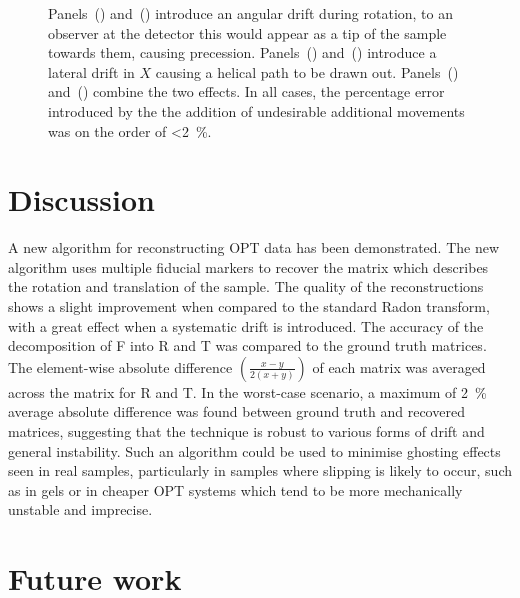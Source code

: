 \documentclass[times, twoside, watermark]{zHenriquesLab-StyleBioRxiv}
\begin{document}
\begin{figure}
{          Panels~() and~() introduce an angular drift during rotation, to an observer at the detector this would appear as a tip of the sample towards them, causing precession.
          Panels~() and~() introduce a lateral drift in \(X\) causing a helical path to be drawn out.
          Panels~() and~() combine the two effects.
          In all cases, the percentage error introduced by the the addition of undesirable additional movements was on the order of \SI{<2}{\percent}.
          }\label{fig:pc_sum_decompose}
\end{figure}

\section*{Discussion}

A new algorithm for reconstructing OPT data has been demonstrated.
The new algorithm uses multiple fiducial markers to recover the matrix which describes the rotation and translation of the sample.
The quality of the reconstructions shows a slight improvement when compared to the standard \gls*{Radon transform}, with a great effect when a systematic drift is introduced.
The accuracy of the decomposition of \gls*{F} into \gls*{R} and \gls*{T} was compared to the ground truth matrices.
The element-wise absolute difference \(\left(\frac{x-y}{2(x+y)}\right)\) of each matrix was averaged across the matrix for \gls*{R} and \gls*{T}.
In the worst-case scenario, a maximum of \SI{2}{\percent} average absolute difference was found between ground truth and recovered matrices,
suggesting that the technique is robust to various forms of drift and general instability.
Such an algorithm could be used to minimise ghosting effects seen in real samples, particularly in samples where slipping is likely to occur, such as in gels or in cheaper \gls*{OPT} systems which tend to be more mechanically unstable and imprecise.

\section*{Future work}
\end{document}
